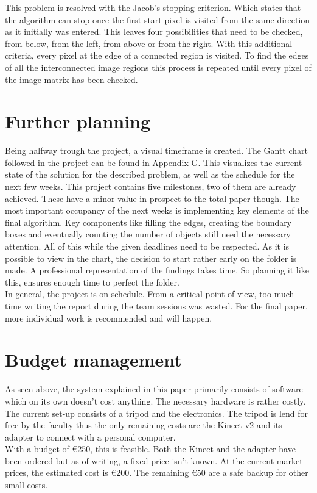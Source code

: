 \documentclass{article}
\begin{document}
\noindent This problem is resolved with the Jacob's stopping criterion. Which states that the algorithm can stop once the first start pixel is visited from the same direction as it initially was entered. This leaves four possibilities that need to be checked, from below, from the left, from above or from the right. With this additional criteria, every pixel at the edge of a connected region is visited. 
To find the edges of all the interconnected image regions this process is repeated until every pixel of the image matrix has been checked. 

\section{Further planning}
Being halfway trough the project, a visual timeframe is created. The Gantt chart followed in the project can be found in Appendix G.
This visualizes the current state of the solution for the described problem, as well as the schedule for the next few weeks. 
This project contains five milestones, two of them are already achieved. These have a minor value in prospect to the total paper though. The most important occupancy of the next weeks is implementing key elements of the final algorithm. Key components like filling the edges, creating the boundary boxes and eventually counting the number of objects still need the necessary attention. All of this while the given deadlines need to be respected. As it is possible to view in the chart, the decision to start rather early on the folder is made. A professional representation of the findings takes time. So planning it like this, ensures enough time to perfect the folder. \\
In general, the project is on schedule. From a critical point of view, too much time writing the report during the team sessions was wasted. For the final paper, more individual work is recommended and will happen.

\section{Budget management}
As seen above, the system explained in this paper primarily consists of software which on its own doesn't cost anything. The necessary hardware is rather costly. The current set-up consists of a tripod and the electronics. The tripod is lend for free by the faculty thus the only remaining costs are the Kinect v2 and its adapter to connect with a personal computer.\\
With a budget of \euro 250, this is feasible. Both the Kinect and the adapter have been ordered but as of writing, a fixed price isn't known. At the current market prices, the estimated cost is \euro 200. The remaining \euro 50 are a safe backup for other small costs.
\end{document}
